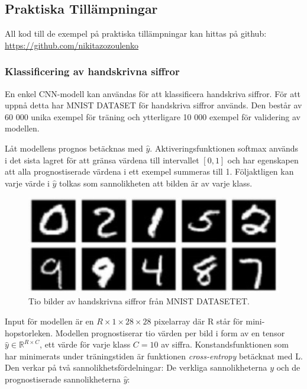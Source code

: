 \documentclass[a4paper,11pt,twoside]{article}
\begin{document}
\subsection{Praktiska Tillämpningar}
All kod till de exempel på praktiska tillämpningar kan hittas på github: \url{https://github.com/nikitazozoulenko}
\subsubsection{Klassificering av handskrivna siffror}
En enkel CNN-modell kan användas för att klassificera handskriva siffror. För att uppnå detta har MNIST DATASET för handskriva siffror används. Den består av 60 000 unika exempel för träning och ytterligare 10 000 exempel för validering av modellen. \cite{MNIST}

Låt modellens prognos betäcknas med $\hat{y}$. Aktiveringsfunktionen softmax används i det sista lagret för att gränsa värdena till intervallet $[0,1]$ och har egenskapen att alla prognostiserade värdena i ett exempel summeras till 1. Följaktligen kan varje värde i $\hat{y}$ tolkas som sannolikheten att bilden är av varje klass. \cite{cs231n}

\begin{figure}[h]\label{figMNIST}
	\centering
  		\includegraphics[scale=1]{mnist.png}
  	\caption{Tio bilder av handskrivna siffror från MNIST DATASETET. \cite{MNIST}}
\end{figure}

Input för modellen är en $R \times 1 \times 28 \times 28$ pixelarray där R står för mini-hopstorleken. Modellen prognostiserar tio värden per bild i form av en tensor $\hat{y} \in \mathbb{R}^{R \times C}$, ett värde för varje klass $C=10$ av siffra. Konstandsfunktionen som har minimerats under träningstiden är funktionen \textit{cross-entropy} betäcknat med L. Den verkar på två sannolikhetsfördelningar: De verkliga sannolikheterna $y$ och de prognostiserade sannolikheterna $\hat{y}$: \cite{cs231n} \cite{notesonbackprop}
\end{document}
